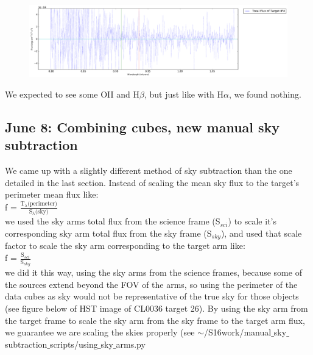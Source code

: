 \documentclass[10pt,letterpaper]{article}
\begin{document}
\begin{figure}[h!]
\includegraphics[scale=0.4]{figures/CL0034-IZ_Target_5_specific_region.pdf}
\end{figure}

We expected to see some OII and H$\beta$, but just like with H$\alpha$, we found nothing.

\subsection{June 8: Combining cubes, new manual sky subtraction}
We came up with a slightly different method of sky subtraction than the one detailed in the last section. Instead of scaling the mean sky flux to the target's perimeter mean flux like:\\
f = $\frac{\text{T}_{\lambda}\text{(perimeter)}}{\text{S}_{\lambda}\text{(sky)}}$\\
we used the sky arms total flux from the science frame (S$_{sci}$) to scale it's corresponding sky arm total flux from the sky frame (S$_{sky}$), and used that scale factor to scale the sky arm corresponding to the target arm like:\\
f = $\frac{\text{S}_{sci}}{\text{S}_{sky}}$\\
we did it this way, using the sky arms from the science frames, because some of the sources extend beyond the FOV of the arms, so using the perimeter of the data cubes as sky would not be representative of the true sky for those objects (see figure below of HST image of CL0036 target 26). By using the sky arm from the target frame to scale the sky arm from the sky frame to the target arm flux, we guarantee we are scaling the skies properly (see $\sim$/S16work/manual$\_$sky$\_$subtraction$\_$scripts/using$\_$sky$\_$arms.py\\
\end{document}
